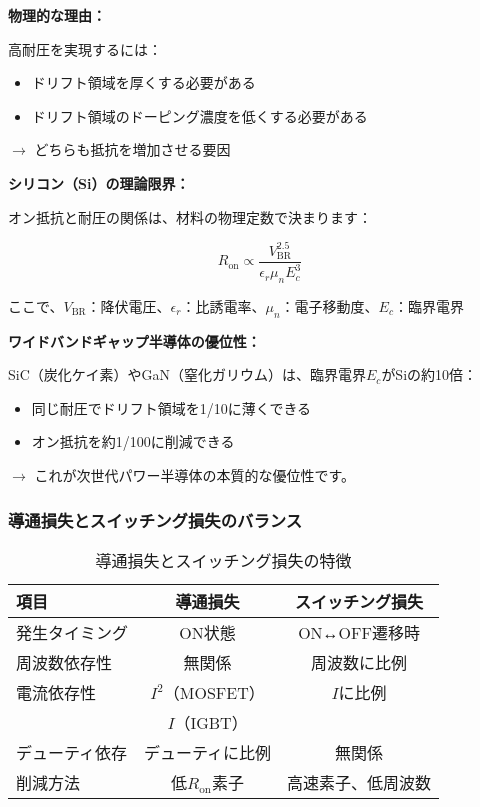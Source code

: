 \begin{screen}
\textbf{物理的な理由：}

高耐圧を実現するには：
\begin{itemize}
\item ドリフト領域を厚くする必要がある
\item ドリフト領域のドーピング濃度を低くする必要がある
\end{itemize}

$\rightarrow$ どちらも抵抗を増加させる要因

\textbf{シリコン（Si）の理論限界：}

オン抵抗と耐圧の関係は、材料の物理定数で決まります：

\begin{equation}
R_{\text{on}} \propto \frac{V_{\text{BR}}^{2.5}}{\epsilon_r \mu_n E_c^3}
\end{equation}

ここで、$V_{\text{BR}}$：降伏電圧、$\epsilon_r$：比誘電率、$\mu_n$：電子移動度、$E_c$：臨界電界

\textbf{ワイドバンドギャップ半導体の優位性：}

SiC（炭化ケイ素）やGaN（窒化ガリウム）は、臨界電界$E_c$がSiの約10倍：

\begin{itemize}
\item 同じ耐圧でドリフト領域を1/10に薄くできる
\item オン抵抗を約1/100に削減できる
\end{itemize}

$\rightarrow$ これが次世代パワー半導体の本質的な優位性です。
\end{screen}

\subsubsection{導通損失とスイッチング損失のバランス}

\begin{table}[H]
\centering
\caption{導通損失とスイッチング損失の特徴}
\begin{tabular}{|l|c|c|}
\hline
\textbf{項目} & \textbf{導通損失} & \textbf{スイッチング損失} \\
\hline
\hline
発生タイミング & ON状態 & ON↔OFF遷移時 \\
\hline
周波数依存性 & 無関係 & 周波数に比例 \\
\hline
電流依存性 & $I^2$（MOSFET） & $I$に比例 \\
& $I$（IGBT） & \\
\hline
デューティ依存 & デューティに比例 & 無関係 \\
\hline
削減方法 & 低$R_{\text{on}}$素子 & 高速素子、低周波数 \\
\hline
\end{tabular}
\end{table}

